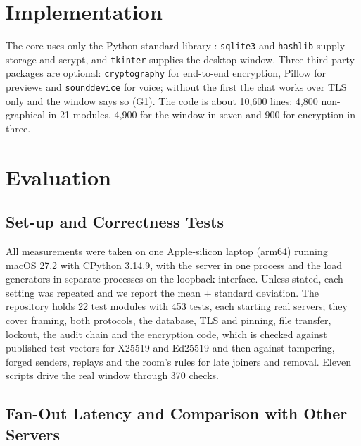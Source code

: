 \documentclass[graybox]{svmult}
\newcommand{\code}[1]{\texttt{#1}}
\begin{document}
\section{Implementation}
\label{sec:impl}
The core uses only the Python standard library \cite{pysocket,pythreading}: \code{sqlite3} and \code{hashlib} supply storage and scrypt, and \code{tkinter} supplies the desktop window. Three third-party packages are optional: \code{cryptography} for end-to-end encryption, Pillow for previews and \code{sounddevice} for voice; without the first the chat works over TLS only and the window says so (G1). The code is about 10,600 lines: 4,800 non-graphical in 21 modules, 4,900 for the window in seven and 900 for encryption in three. 

\section{Evaluation}
\label{sec:eval}
\subsection{Set-up and Correctness Tests}
All measurements were taken on one Apple-silicon laptop (arm64) running macOS 27.2 with CPython 3.14.9, with the server in one process and the load generators in separate processes on the loopback interface. Unless stated, each setting was repeated and we report the mean $\pm$ standard deviation. The repository holds 22 test modules with 453 tests, each starting real servers; they cover framing, both protocols, the database, TLS and pinning, file transfer, lockout, the audit chain and the encryption code, which is checked against published test vectors for X25519 and Ed25519 \cite{rfc7748,rfc8032} and then against tampering, forged senders, replays and the room's rules for late joiners and removal. Eleven scripts drive the real window through 370 checks.

\subsection{Fan-Out Latency and Comparison with Other Servers}
\end{document}
